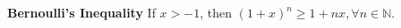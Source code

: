 \documentclass[10pt,landscape]{article}
\begin{document}
\begin{multicols}{4}






















\textbf{Bernoulli's Inequality} If $x > -1$, then $(1 + x)^n \geq 1 + nx, \forall n \in \mathbb{N}$.



\end{multicols}
\end{document}
